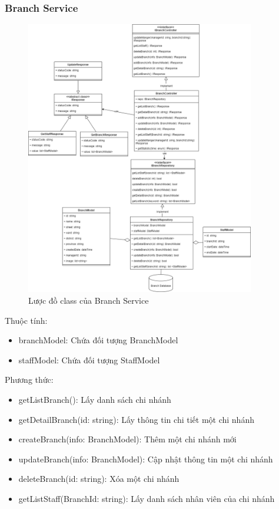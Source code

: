 \subsubsection{Branch Service}
\begin{figure}[!htp]
	\centering
	\includegraphics[width=10cm]{img/Architecture/service/BranchService.png}
	\newline
	\caption{Lược đồ class của Branch Service}
\end{figure}

Thuộc tính:
\begin{itemize}
	\item branchModel: Chứa đối tượng BranchModel
	\item staffModel: Chứa đối tượng StaffModel
\end{itemize}
Phương thức:
\begin{itemize}
	\item getListBranch(): Lấy danh sách chi nhánh
	\item getDetailBranch(id: string): Lấy thông tin chi tiết một chi nhánh
	\item createBranch(info: BranchModel): Thêm một chi nhánh mới
	\item updateBranch(info: BranchModel): Cập nhật thông tin một chi nhánh
	\item deleteBranch(id: string): Xóa một chi nhánh
	\item getListStaff(BranchId: string): Lấy danh sách nhân viên của chi nhánh
\end{itemize}

